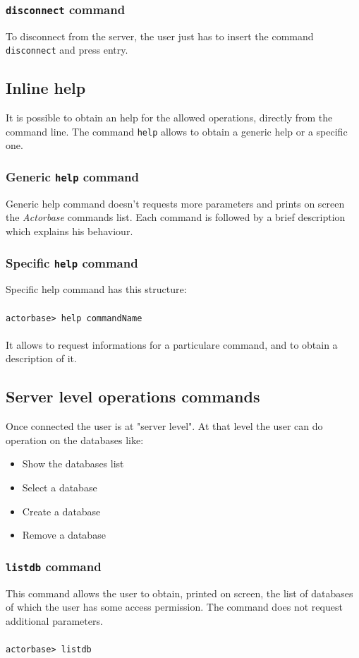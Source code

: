 \documentclass[a4paper]{article}
\begin{document}
	\subsubsection{\texttt{disconnect} command}
	To disconnect from the server, the user just has to insert the command \texttt{disconnect} and press entry.
	

	\subsection{Inline help}
	It is possible to obtain an help for the allowed operations, directly from the command line. The command \texttt{help} allows to obtain a generic help or a specific one.
	
	\subsubsection{Generic \texttt{help} command}
	Generic help command doesn't requests more parameters and prints on screen the \emph{Actorbase} commands list. Each command is followed by a brief description which explains his behaviour.
	
	\subsubsection{Specific \texttt{help} command}
	Specific help command has this structure:
	\\ \\
	\texttt{actorbase>	help commandName}
	\\ \\
	It allows to request informations for a particulare command, and to obtain a description of it.
	
	\subsection{Server level operations commands}
	Once connected the user is at "server level". At that level the user can do operation on the databases like:
	\begin{itemize}
		\item Show the databases list
		\item Select a database
		\item Create a database
		\item Remove a database
	\end{itemize}
	
	\subsubsection{\texttt{listdb} command}
	This command allows the user to obtain, printed on screen, the list of databases of which the user has some access permission. The command does not request additional parameters.
	\\ \\
	\texttt{actorbase>	listdb}
\end{document}
